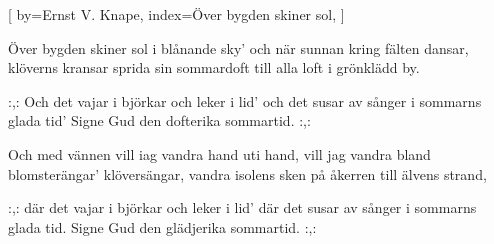 

[
by={Ernst V. Knape},
index={Över bygden skiner sol},
]

\beginverse*
Över bygden skiner sol i blånande sky'
och när sunnan kring fälten dansar,
klöverns kransar
sprida sin sommardoft
till alla loft
i grönklädd by.
\endverse

\beginchorus
:,: Och det vajar i björkar och leker i lid'
och det susar av sånger i sommarns glada tid'
Signe Gud den dofterika sommartid. :,:
\endchorus							%

\beginverse* 
Och med vännen vill iag vandra hand uti hand,
vill jag vandra bland blomsterängar'
klöversängar,
vandra isolens sken
på åkerren
till älvens strand,
\endverse

\beginchorus
:,: där det vajar i björkar och leker i lid'
där det susar av sånger i sommarns glada tid.
Signe Gud den glädjerika sommartid. :,:
\endchorus	
\endsong


